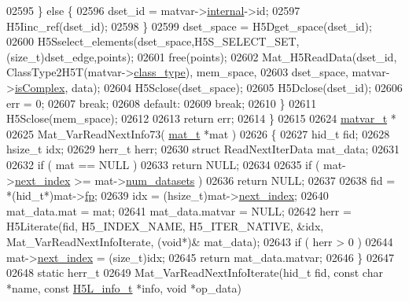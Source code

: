 \begin{DoxyCode}
{{{{{{{{{{02595             \} \textcolor{keywordflow}{else} \{
02596                 dset\_id = matvar->\hyperlink{group___m_a_t_a6e97e3ed9f40c49322c18561c2a94e92}{internal}->id;
02597                 H5Iinc\_ref(dset\_id);
02598             \}
02599             dset\_space = H5Dget\_space(dset\_id);
02600             H5Sselect\_elements(dset\_space,H5S\_SELECT\_SET,(\textcolor{keywordtype}{size\_t})dset\_edge,points);
02601             free(points);
02602             Mat\_H5ReadData(dset\_id, ClassType2H5T(matvar->\hyperlink{group___m_a_t_aff13035bf3265dd7d9425e5d40c839d4}{class\_type}), mem\_space,
02603                 dset\_space, matvar->\hyperlink{group___m_a_t_aeb03b3a69f108dc05470b00443a43739}{isComplex}, data);
02604             H5Sclose(dset\_space);
02605             H5Dclose(dset\_id);
02606             err = 0;
02607             \textcolor{keywordflow}{break};
02608         \textcolor{keywordflow}{default}:
02609             \textcolor{keywordflow}{break};
02610     \}
02611     H5Sclose(mem\_space);
02612 
02613     \textcolor{keywordflow}{return} err;
02614 \}
02615 
02624 \hyperlink{group___m_a_t_structmatvar__t}{matvar\_t} *
02625 Mat\_VarReadNextInfo73( \hyperlink{struct__mat__t}{mat\_t} *mat )
02626 \{
02627     hid\_t   fid;
02628     hsize\_t idx;
02629     herr\_t  herr;
02630     \textcolor{keyword}{struct }ReadNextIterData mat\_data;
02631 
02632     \textcolor{keywordflow}{if} ( mat == NULL )
02633         \textcolor{keywordflow}{return} NULL;
02634 
02635     \textcolor{keywordflow}{if} ( mat->\hyperlink{struct__mat__t_a0163a12f9735356723bb604992639d9e}{next\_index} >= mat->\hyperlink{struct__mat__t_af37d0ba323e65edb27ecd5a2f766a3a4}{num\_datasets} )
02636         \textcolor{keywordflow}{return} NULL;
02637 
02638     fid = *(hid\_t*)mat->\hyperlink{struct__mat__t_a85f562e407ca9ad4d2a6e14f839432b7}{fp};
02639     idx = (hsize\_t)mat->\hyperlink{struct__mat__t_a0163a12f9735356723bb604992639d9e}{next\_index};
02640     mat\_data.mat = mat;
02641     mat\_data.matvar = NULL;
02642     herr = H5Literate(fid, H5\_INDEX\_NAME, H5\_ITER\_NATIVE, &idx, Mat\_VarReadNextInfoIterate, (\textcolor{keywordtype}{void}*)&
      mat\_data);
02643     \textcolor{keywordflow}{if} ( herr > 0 )
02644         mat->\hyperlink{struct__mat__t_a0163a12f9735356723bb604992639d9e}{next\_index} = (size\_t)idx;
02645     \textcolor{keywordflow}{return} mat\_data.matvar;
02646 \}
02647 
02648 \textcolor{keyword}{static} herr\_t
02649 Mat\_VarReadNextInfoIterate(hid\_t fid, \textcolor{keyword}{const} \textcolor{keywordtype}{char} *name, \textcolor{keyword}{const} \hyperlink{struct_h5_l__info__t}{H5L\_info\_t} *info, \textcolor{keywordtype}{void} *op\_data)
}}}}}}}}}}
\end{DoxyCode}
